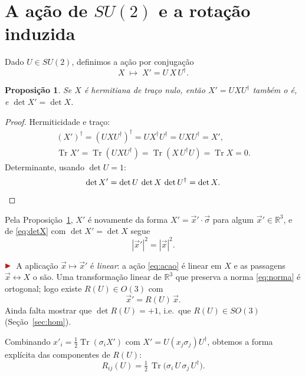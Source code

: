 \documentclass[12pt,a4paper]{article}
\newcommand{\marcador}{\ensuremath{\color{corDestaque}\blacktriangleright}\,}
\newenvironment{nota}{\par\color{corDestaque}\noindent\marcador\ignorespaces}{\par}
\newcommand{\R}{\mathbb{R}}
\newcommand{\dg}{\dagger}
\newcommand{\Tr}{\operatorname{Tr}}
\newcommand{\vsig}{\vec{\sigma}}
\newcommand{\vx}{\vec{x}}
\theoremstyle{definition}
\theoremstyle{plain}
\newtheorem{proposicao}{Proposição}
\theoremstyle{remark}
\begin{document}
\section{A ação de $SU(2)$ e a rotação induzida}

Dado $U\in SU(2)$, definimos a ação por conjugação
\begin{equation}\label{eq:acao}
  X\;\longmapsto\;X'=U\,X\,U^{\dg}.
\end{equation}

\begin{proposicao}\label{prop:invariantes}
Se $X$ é hermitiana de traço nulo, então $X'=UXU^{\dg}$ também o é, e
$\det X'=\det X$.
\end{proposicao}
\begin{proof}
Hermiticidade e traço:
\begin{gather*}
  (X')^{\dg}=(UXU^{\dg})^{\dg}=U X^{\dg} U^{\dg}=UXU^{\dg}=X',\\[2pt]
  \Tr X'=\Tr(UXU^{\dg})=\Tr(X\,U^{\dg}U)=\Tr X=0 .
\end{gather*}
Determinante, usando $\det U=1$:
\[
  \det X'=\det U\,\det X\,\det U^{\dg}=\det X. \qedhere
\]
\end{proof}

Pela Proposição~\ref{prop:invariantes}, $X'$ é novamente da forma
$X'=\vx'\cdot\vsig$ para algum $\vx'\in\R^3$, e de \eqref{eq:detX} com
$\det X'=\det X$ segue
\begin{equation}\label{eq:norma}
  |\vx'|^2=|\vx|^2 .
\end{equation}

\begin{nota}
A aplicação $\vx\mapsto\vx'$ é \emph{linear}: a ação \eqref{eq:acao} é linear
em $X$ e as passagens $\vx\leftrightarrow X$ o são. Uma transformação linear
de $\R^3$ que preserva a norma \eqref{eq:norma} é ortogonal; logo existe
$R(U)\in O(3)$ com
\[
  \vx'=R(U)\,\vx .
\]
Ainda falta mostrar que $\det R(U)=+1$, i.e.\ que $R(U)\in SO(3)$
(Seção~\ref{sec:hom}).
\end{nota}

Combinando $x'_i=\tfrac12\Tr(\sigma_i X')$ com $X'=U(x_j\sigma_j)U^{\dg}$,
obtemos a forma explícita das componentes de $R(U)$:
\begin{equation}\label{eq:Rij}
  \boxed{\,R_{ij}(U)=\tfrac12\,\Tr\!\bigl(\sigma_i\,U\,\sigma_j\,U^{\dg}\bigr).\,}
\end{equation}
\end{document}

